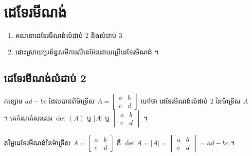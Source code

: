\chapter{ដេទែរមីណង់}

\begin{objBox}[វត្ថុបំណង]
\begin{enumerate}[1]
  \item គណនាដេទែរមីណង់លំដាប់ $2$ និងលំដាប់ $3$
  \item ដោះស្រាយប្រព័ន្ធសមីការលីនេអ៊ែរដោយប្រើដេទែរមីណង់ ។
\end{enumerate}
\end{objBox}

\section{ដេទែរមីណង់លំដាប់ 2}

កន្សោម $ad - bc$ ដែលបានពីម៉ាទ្រីស $A = \begin{bmatrix} a & b\\ c & d \end{bmatrix}$ ហៅថា ដេទែរមីណង់លំដាប់ $2$ នៃម៉ាទ្រីស $A$ ។ គេកំណត់សរសេរ $\det(A)$ ឬ $|A|$ ឬ $\begin{vmatrix} a & b\\ c & d \end{vmatrix}$ ។

\begin{formulaBox}[ដេទែរមីណង់លំដាប់ 2]
តម្លៃដេទែរមីណង់នៃម៉ាទ្រីស $A = \begin{bmatrix} a & b\\ c & d \end{bmatrix}$ គឺ $\det A = |A| = \begin{vmatrix} a & b\\ c & d \end{vmatrix} = ad - bc$ ។
\end{formulaBox}

